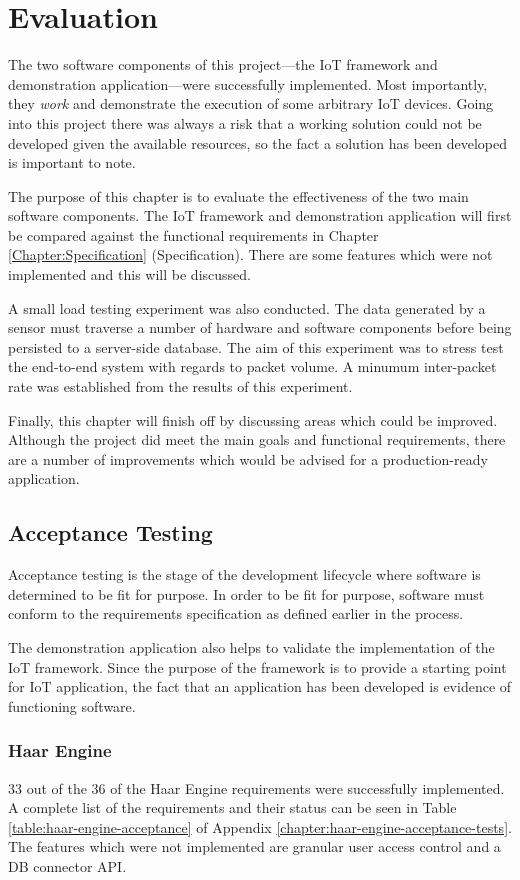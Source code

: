 \chapter{Evaluation}
  The two software components of this project---the IoT framework and demonstration application---were successfully implemented. Most importantly, they \textit{work} and demonstrate the execution of some arbitrary IoT devices. Going into this project there was always a risk that a working solution could not be developed given the available resources, so the fact a solution has been developed is important to note. 

  The purpose of this chapter is to evaluate the effectiveness of the two main software components. The IoT framework and demonstration application will first be compared against the functional requirements in Chapter \ref{Chapter:Specification} (Specification). There are some features which were not implemented and this will be discussed.

  A small load testing experiment was also conducted. The data generated by a sensor must traverse a number of hardware and software components before being persisted to a server-side database. The aim of this experiment was to stress test the end-to-end system with regards to packet volume. A minumum inter-packet rate was established from the results of this experiment.

  Finally, this chapter will finish off by discussing areas which could be improved. Although the project did meet the main goals and functional requirements, there are a number of improvements which would be advised for a production-ready application.

  \section{Acceptance Testing}
    Acceptance testing is the stage of the development lifecycle where software is determined to be fit for purpose. In order to be fit for purpose, software must conform to the requirements specification as defined earlier in the process.

    The demonstration application also helps to validate the implementation of the IoT framework. Since the purpose of the framework is to provide a starting point for IoT application, the fact that an application has been developed is evidence of functioning software.

    \subsection{Haar Engine}
      33 out of the 36 of the Haar Engine requirements were successfully implemented. A complete list of the requirements and their status can be seen in Table \ref{table:haar-engine-acceptance} of Appendix \ref{chapter:haar-engine-acceptance-tests}. The features which were not implemented are granular user access control and a DB connector API.

